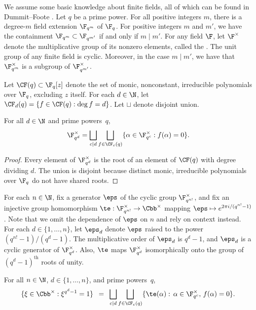 We assume some basic knowledge about finite fields, all of which can be found in Dummit--Foote \cite{DF}.
Let \(q\) be a prime power.
For all positive integers \(m\), there is a degree-\(m\) field extension \(\F_{q^m}\) of \(\F_q\).
For positive integers \(m\) and \(m'\), we have the containment \(\F_{q^m} \subset \F_{q^{m'}}\) if and only if \(m \mid m'\).
For any field \(\F\), let \(\F^\times\) denote the multiplicative group of its nonzero elements, called the .
The unit group of any finite field is cyclic.
Moreover, in the case \(m \mid m'\), we have that \(\F_{q^m}^\times\) is a subgroup of \(\F_{q^{m'}}^\times\).

Let \(\CF (q) \subset \F_q[z] \) denote the set of monic, nonconstant, irreducible polynomials over \(\F_q\), excluding \(z\) itself.
For each \(d \in \N\), let \(\CF_d (q) = \{f \in \CF (q) : \deg f = d\}\).
Let \(\sqcup\) denote disjoint union.
\begin{lemma}
\label{root_union}
For all \(d \in \N\) and prime powers~\(q\),
\begin{equation}
\label{root_union_eq}
\F_{q^d}^\times
=
\bigsqcup_{c \mid d}
\bigsqcup_{f \in \CF_c (q)}
\{\alpha \in \F_{q^c}^\times : f(\alpha) = 0\}.
\end{equation}
\end{lemma}
\begin{proof}
Every element of \(\F_{q^d}^\times\) is the root of an element of \(\CF (q)\) with degree dividing \(d\).
The union is disjoint because distinct monic, irreducible polynomials over \(\F_q\) do not have shared roots.
\end{proof}

For each \(n \in \N\), fix a generator \(\eps\) of the cyclic group \(\F_{q^{n!}}^\times\), and fix an injective group homomorphism \(\te : \F_{q^{n!}}^\times \to \Cbb^\times\) mapping \(\eps \mapsto e^{2 \pi i / (q^{n!}-1)}\).
Note that we omit the dependence of \(\eps\) on \(n\)
and rely on context instead.
For each \(d \in \{1,\ldots,n\}\), let \(\eps_d\) denote \(\eps\) raised to the power \( (q^{n!}-1) / (q^d-1)\).
The multiplicative order of \(\eps_d\) is \(q^d-1\), and \(\eps_d\) is a cyclic generator of \(\F_{q^d}^\times\).
Also, \(\te\) maps \(\F_{q^d}^\times\) isomorphically onto the group of \((q^d-1)^\text{th}\) roots of unity.

\begin{corollary}
\label{theta_of_root_union}
For all \(n \in \N\), \(d \in \{1,\ldots,n\}\), and prime powers~\(q\),
\begin{equation}
\label{theta_of_root_union_eq}
\{\xi \in \Cbb^\times : \xi^{q^d-1} = 1\}
\,\,\,
=
\,\,\,
\bigsqcup_{c \mid d}
\bigsqcup_{f \in \CF_c (q)}
\{\te(\alpha) : \, \alpha \in \F_{q^c}^\times, \, f(\alpha) = 0\}.
\end{equation}
\end{corollary}

